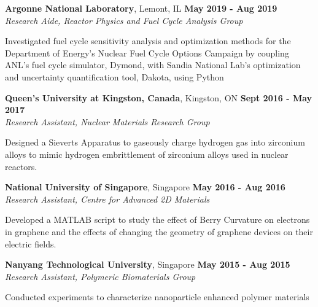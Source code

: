 \documentclass[margin,line]{resume}
\begin{document}
\begin{resume}
    \textbf{Argonne National Laboratory}, Lemont, IL \hfill \textbf{May 2019 - Aug 2019}\\\vspace{-4mm}%
		\textsl{Research Aide, Reactor Physics and Fuel Cycle Analysis Group}\\
                \begin{list2}
                        \item Investigated fuel cycle sensitivity analysis and optimization methods for the Department of Energy's 
                        Nuclear Fuel Cycle Options Campaign by coupling ANL's fuel cycle simulator, Dymond, 
                        with Sandia National Lab's optimization and uncertainty quantification tool, Dakota, using Python
                \end{list2}\vspace{-1.5mm}

        \textbf{Queen’s University at Kingston, Canada}, Kingston, ON \hfill \textbf{Sept 2016 - May 2017}\\\vspace{-4mm}%
		\textsl{Research Assistant, Nuclear Materials Research Group}\\
                \begin{list2}
                        \item Designed a Sieverts Apparatus to gaseously charge hydrogen gas into zirconium alloys to 
                        mimic hydrogen embrittlement of zirconium alloys used in nuclear reactors.
                \end{list2}\vspace{-1.5mm}

        \textbf{National University of Singapore}, Singapore \hfill \textbf{May 2016 - Aug 2016}\\\vspace{-4mm}%
		\textsl{Research Assistant, Centre for Advanced 2D Materials}\\
                \begin{list2}
                        \item Developed a MATLAB script to study the effect of Berry Curvature on electrons in graphene and the 
                        effects of changing the geometry of graphene devices on their electric fields. 
                \end{list2}\vspace{-1.5mm}

        \textbf{Nanyang Technological University}, Singapore \hfill \textbf{May 2015 - Aug 2015}\\\vspace{-4mm}%
		\textsl{Research Assistant, Polymeric Biomaterials Group}\\
                \begin{list2}
                        \item Conducted experiments to characterize nanoparticle enhanced polymer materials  
                \end{list2}\vspace{-1.5mm}

\end{resume}
\end{document}

